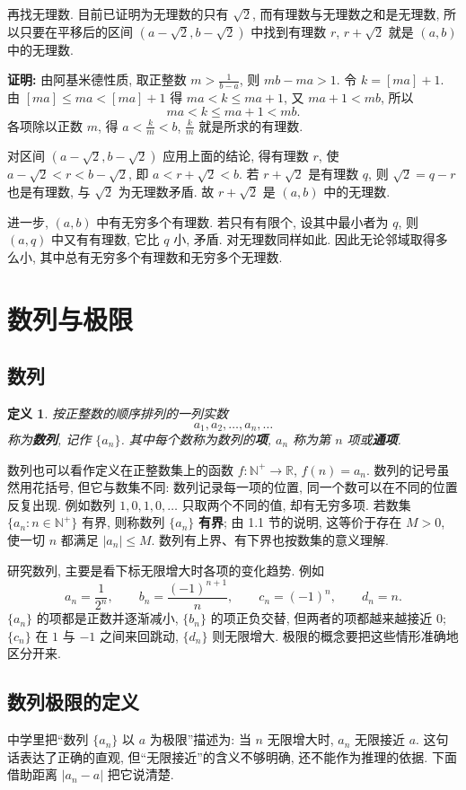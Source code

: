 \documentclass[UTF8,openany]{ctexbook}
\theoremstyle{chinesetextbook}
\newtheorem{definition}{定义}[section]
\newenvironment{cnproof}{\par\indent\textbf{证明:} \ignorespaces}{\par}
\begin{document}
再找无理数. 目前已证明为无理数的只有 $\sqrt2$, 而有理数与无理数之和是无理数, 所以只要在平移后的区间 $(a-\sqrt2,b-\sqrt2)$ 中找到有理数 $r$, $r+\sqrt2$ 就是 $(a,b)$ 中的无理数.
\begin{cnproof}
由阿基米德性质, 取正整数 $\displaystyle m>\frac1{b-a}$, 则 $mb-ma>1$. 令 $k=[ma]+1$. 由 $[ma]\le ma<[ma]+1$ 得 $ma<k\le ma+1$, 又 $ma+1<mb$, 所以
\[
ma<k\le ma+1<mb.
\]
各项除以正数 $m$, 得 $\displaystyle a<\frac km<b$, $\displaystyle\frac km$ 就是所求的有理数.

对区间 $(a-\sqrt2,b-\sqrt2)$ 应用上面的结论, 得有理数 $r$, 使 $a-\sqrt2<r<b-\sqrt2$, 即 $a<r+\sqrt2<b$. 若 $r+\sqrt2$ 是有理数 $q$, 则 $\sqrt2=q-r$ 也是有理数, 与 $\sqrt2$ 为无理数矛盾. 故 $r+\sqrt2$ 是 $(a,b)$ 中的无理数.
\end{cnproof}
进一步, $(a,b)$ 中有无穷多个有理数. 若只有有限个, 设其中最小者为 $q$, 则 $(a,q)$ 中又有有理数, 它比 $q$ 小, 矛盾. 对无理数同样如此. 因此无论邻域取得多么小, 其中总有无穷多个有理数和无穷多个无理数.
\section{数列与极限}
\subsection{数列}
\begin{definition}
按正整数的顺序排列的一列实数
\[
a_1,a_2,\ldots,a_n,\ldots
\]
称为\textbf{数列}, 记作 $\{a_n\}$. 其中每个数称为数列的\textbf{项}, $a_n$ 称为第 $n$ 项或\textbf{通项}.
\end{definition}
数列也可以看作定义在正整数集上的函数 $f:\mathbb N^+\to\mathbb R$, $f(n)=a_n$. 数列的记号虽然用花括号, 但它与数集不同: 数列记录每一项的位置, 同一个数可以在不同的位置反复出现. 例如数列 $1,0,1,0,\ldots$ 只取两个不同的值, 却有无穷多项. 若数集 $\{a_n:n\in\mathbb N^+\}$ 有界, 则称数列 $\{a_n\}$ \textbf{有界}; 由 1.1 节的说明, 这等价于存在 $M>0$, 使一切 $n$ 都满足 $|a_n|\le M$. 数列有上界、有下界也按数集的意义理解.

研究数列, 主要是看下标无限增大时各项的变化趋势. 例如
\[
a_n=\frac1{2^n},\qquad b_n=\frac{(-1)^{n+1}}n,\qquad c_n=(-1)^n,\qquad d_n=n.
\]
$\{a_n\}$ 的项都是正数并逐渐减小, $\{b_n\}$ 的项正负交替, 但两者的项都越来越接近 $0$; $\{c_n\}$ 在 $1$ 与 $-1$ 之间来回跳动, $\{d_n\}$ 则无限增大. 极限的概念要把这些情形准确地区分开来.
\subsection{数列极限的定义}
中学里把“数列 $\{a_n\}$ 以 $a$ 为极限”描述为: 当 $n$ 无限增大时, $a_n$ 无限接近 $a$. 这句话表达了正确的直观, 但“无限接近”的含义不够明确, 还不能作为推理的依据. 下面借助距离 $|a_n-a|$ 把它说清楚.
\end{document}
